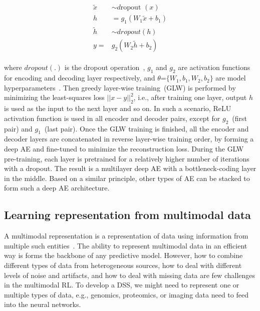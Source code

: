 \vspace{-6mm}
\begin{align}
    \begin{aligned}
        \tilde{x} & \sim d \text {ropout }(x) \\
        h &=g_{1}\left(W_{1} \tilde{x}+b_{1}\right) \\
        \tilde{h} & \sim d r o p o u t(h) \\
        y=& g_{2}\left(W_{2} \tilde{h}+b_{2}\right)
    \end{aligned}
\end{align}

\noindent where $dropout(.)$ is the dropout operation~\cite{srivastava2014dropout}, $g_1$ and $g_2$ are activation functions for encoding and decoding layer respectively, and $\theta$=$\lbrace{W_1, b_1, W_2, b_2}\rbrace$ are model hyperparameters~\cite{xie2016unsupervised}. Then greedy layer-wise training~(GLW) is performed by minimizing the least-squares loss $||x-y||^{2}_{2}$, i.e., after training one layer, output $h$ is used as the input to the next layer and so on. In such a scenario, ReLU activation function is used in all encoder and decoder pairs, except for $g_2$~(first pair) and $g_1$~(last pair). Once the GLW training is finished, all the encoder and decoder layers are concatenated in reverse layer-wise training order, by forming a deep AE and fine-tuned to minimize the reconstruction loss. During the GLW pre-training, each layer is pretrained for a relatively higher number of iterations with a dropout. The result is a multilayer deep AE with a bottleneck-coding layer in the middle. Based on a similar principle, other types of AE can be stacked to form such a deep AE architecture. 

\subsection{Learning representation from multimodal data}
A multimodal representation is a representation of data using information from multiple such entities~\cite{mmsurvey}. The ability to represent multimodal data in an efficient way is forms the backbone of any predictive model. However, how to combine different types of data from heterogeneous sources, how to deal with different levels of noise and artifacts, and how to deal with missing data are few challenges in the multimodal RL. To develop a DSS, we might need to represent one or multiple types of data, e.g., genomics, proteomics, or imaging data need to feed into the neural networks. \\

